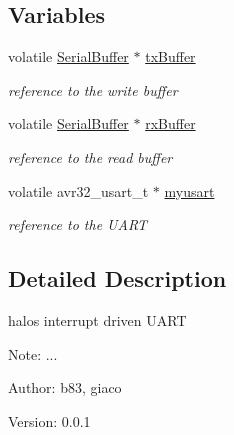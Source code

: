 \subsection*{Variables}
\begin{CompactItemize}
\item 
\hypertarget{group___u_a_r_t_gd7f6a2a3df8e38e27346cdce67a384e5}{
volatile \hyperlink{struct_serial_buffer_tag}{SerialBuffer} $\ast$ \hyperlink{group___u_a_r_t_gd7f6a2a3df8e38e27346cdce67a384e5}{txBuffer}}
\label{group___u_a_r_t_gd7f6a2a3df8e38e27346cdce67a384e5}

\begin{CompactList}\small\item\em reference to the write buffer \item\end{CompactList}\item 
\hypertarget{group___u_a_r_t_ga9654342dbd9496b7f76a6453a7f0dff}{
volatile \hyperlink{struct_serial_buffer_tag}{SerialBuffer} $\ast$ \hyperlink{group___u_a_r_t_ga9654342dbd9496b7f76a6453a7f0dff}{rxBuffer}}
\label{group___u_a_r_t_ga9654342dbd9496b7f76a6453a7f0dff}

\begin{CompactList}\small\item\em reference to the read buffer \item\end{CompactList}\item 
\hypertarget{group___u_a_r_t_g6dd5e0e639beaa7c61014c923478b465}{
volatile avr32\_\-usart\_\-t $\ast$ \hyperlink{group___u_a_r_t_g6dd5e0e639beaa7c61014c923478b465}{myusart}}
\label{group___u_a_r_t_g6dd5e0e639beaa7c61014c923478b465}

\begin{CompactList}\small\item\em reference to the UART \item\end{CompactList}\end{CompactItemize}


\subsection{Detailed Description}
halos interrupt driven UART 

\begin{Desc}
\item[Note:]... \end{Desc}
\begin{Desc}
\item[Author:]b83, giaco \end{Desc}
\begin{Desc}
\item[Version:]0.0.1 \end{Desc}


